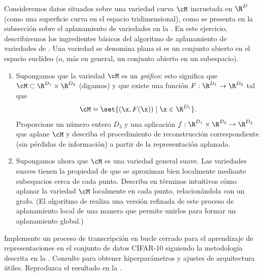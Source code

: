 \documentclass[../../book-main_es.tex]{subfiles}
\begin{document}
\begin{exercise}
Consideremos datos situados sobre una variedad curva $\cM$ incrustada en $\R^D$ (como
una superficie curva en el espacio tridimensional), como se presenta en la subsección sobre
el aplanamiento de variedades en la .
En este ejercicio, describiremos los ingredientes básicos del algoritmo de
aplanamiento de variedades de \cite{Psenka-JMLR24}.
Una variedad se denomina plana si es un conjunto abierto en el espacio euclídeo (o,
más en general, un conjunto abierto en un subespacio).

\begin{enumerate}
\item Supongamos que la variedad $\cM$ es un \textit{gráfico}: esto significa que $\cM
    \subset \R^{D_1} \times \R^{D_2}$ (digamos) y que existe una función $F
    : \R^{D_1} \to \R^{D_2}$ tal que
    \begin{equation}
        \cM = \set{(\x, F(\x)) \mid \x \in \R^{D_1}}.
    \end{equation}
    Proporcione un número entero $D_3$ y una aplicación $f : \R^{D_1} \times \R^{D_2} \to \R^{D_3}$
    que aplane $\cM$ y describa el procedimiento de reconstrucción correspondiente (sin pérdidas de información)
    a partir de la representación aplanada.
\item Supongamos ahora que $\cM$ es una variedad general suave. Las variedades suaves
    tienen la propiedad de que se aproximan bien localmente mediante subespacios
    cerca de cada punto. Describa en términos intuitivos cómo aplanar la variedad
    $\cM$ localmente en cada punto, relacionándola con un grafo. (El algoritmo de
        \cite{Psenka-JMLR24} realiza una versión refinada de este proceso de aplanamiento local
        de una manera que permite unirlos para formar un 
    aplanamiento global.)
\end{enumerate}
\end{exercise}

\begin{exercise}

Implemente un proceso de transcripción en bucle cerrado para el aprendizaje de representaciones en
el conjunto de datos CIFAR-10 siguiendo
la metodología descrita en la .
Consulte \cite{Dai-entropy-2022} para obtener hiperparámetros y ajustes de arquitectura útiles.
Reproduzca el resultado en la .

\end{exercise}
\end{document}

